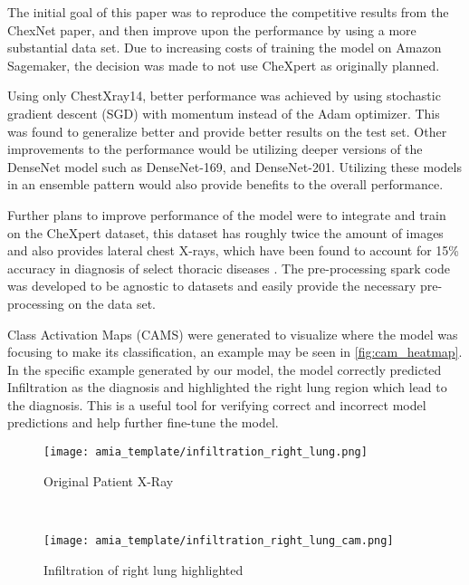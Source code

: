\documentclass{amia}
\begin{document}
The initial goal of this paper was to reproduce the competitive results from the ChexNet paper, and then improve upon the performance by using a more substantial data set. Due to increasing costs of training the model on Amazon Sagemaker, the decision was made to not use CheXpert as originally planned.

Using only ChestXray14, better performance was achieved by using stochastic gradient descent (SGD) with momentum instead of the Adam optimizer. This was found to generalize better \cite{ref13} and provide better results on the test set. Other improvements to the performance would be utilizing deeper versions of the DenseNet model such as DenseNet-169, and DenseNet-201. Utilizing these models in an ensemble pattern would also provide benefits to the overall performance.

Further plans to improve performance of the model were to integrate and train on the CheXpert dataset, this dataset has roughly twice the amount of images and also provides lateral chest X-rays, which have been found to account for 15\% accuracy in diagnosis of select thoracic diseases \cite{ref2}. The pre-processing spark code was developed to be agnostic to datasets and easily provide the necessary pre-processing on the data set.

Class Activation Maps (CAMS) were generated to visualize where the model was focusing to make its classification, an example may be seen in \ref{fig:cam_heatmap}. In the specific example generated by our model, the model correctly predicted Infiltration as the diagnosis and highlighted the right lung region which lead to the diagnosis. This is a useful tool for verifying correct and incorrect model predictions and help further fine-tune the model.

\begin{figure*}[t!]
    \centering
    \begin{subfigure}[t]{0.5\textwidth}
        \centering
        \texttt{[image: amia\_template/infiltration\_right\_lung.png]}
        \caption{Original Patient X-Ray}
    \end{subfigure}%
    ~
    \begin{subfigure}[t]{0.5\textwidth}
        \centering
        \texttt{[image: amia\_template/infiltration\_right\_lung\_cam.png]}
        \caption{Infiltration of right lung highlighted}
    \end{subfigure}
    \caption{Patient X-Ray \& CAM Heatmap}
\label{fig:cam_heatmap}
\end{figure*}
\end{document}
